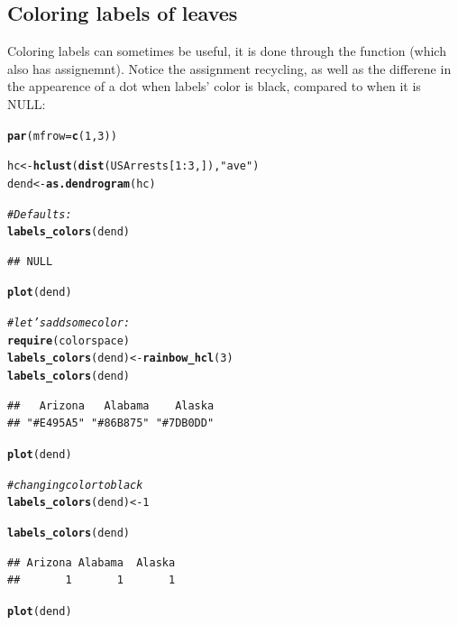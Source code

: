 \documentclass[shortnames,nojss,article]{jss}\usepackage[]{graphicx}\usepackage[]{color}
\makeatletter
\newcommand{\hlnum}[1]{\textcolor[rgb]{0.686,0.059,0.569}{#1}}%
\newcommand{\hlstr}[1]{\textcolor[rgb]{0.192,0.494,0.8}{#1}}%
\newcommand{\hlcom}[1]{\textcolor[rgb]{0.678,0.584,0.686}{\textit{#1}}}%
\newcommand{\hlopt}[1]{\textcolor[rgb]{0,0,0}{#1}}%
\newcommand{\hlstd}[1]{\textcolor[rgb]{0.345,0.345,0.345}{#1}}%
\newcommand{\hlkwb}[1]{\textcolor[rgb]{0.69,0.353,0.396}{#1}}%
\newcommand{\hlkwc}[1]{\textcolor[rgb]{0.333,0.667,0.333}{#1}}%
\newcommand{\hlkwd}[1]{\textcolor[rgb]{0.737,0.353,0.396}{\textbf{#1}}}%
\newenvironment{kframe}{%
 \def\at@end@of@kframe{}%
 \ifinner\ifhmode%
  \def\at@end@of@kframe{\end{minipage}}%
  \begin{minipage}{\columnwidth}%
 \fi\fi%
 \def\FrameCommand##1{\hskip\@totalleftmargin \hskip-\fboxsep
 \colorbox{shadecolor}{##1}\hskip-\fboxsep
     \hskip-\linewidth \hskip-\@totalleftmargin \hskip\columnwidth}%
 \MakeFramed {\advance\hsize-\width
   \@totalleftmargin\z@ \linewidth\hsize
   \@setminipage}}%
 {\par\unskip\endMakeFramed%
 \at@end@of@kframe}
\newenvironment{knitrout}{}{} %
\makeatother
\begin{document}
\subsection{Coloring labels of leaves}

Coloring labels can sometimes be useful, it is done through the  function (which also has assignemnt). Notice the assignment recycling, as well as the differene in the appearence of a dot when labels' color is black, compared to when it is NULL:

\begin{knitrout}
\color{fgcolor}\begin{kframe}
\begin{alltt}
\hlkwd{par}\hlstd{(}\hlkwc{mfrow} \hlstd{=} \hlkwd{c}\hlstd{(}\hlnum{1}\hlstd{,} \hlnum{3}\hlstd{)}\hlstd{)}

\hlstd{hc} \hlkwb{<-} \hlkwd{hclust}\hlstd{(}\hlkwd{dist}\hlstd{(USArrests[}\hlnum{1}\hlopt{:}\hlnum{3}\hlstd{, ]),} \hlstr{"ave"}\hlstd{)}
\hlstd{dend} \hlkwb{<-} \hlkwd{as.dendrogram}\hlstd{(hc}\hlstd{)}

\hlcom{# Defaults:}
\hlkwd{labels_colors}\hlstd{(dend)}
\end{alltt}
\begin{verbatim}
## NULL
\end{verbatim}
\begin{alltt}
\hlkwd{plot}\hlstd{(dend}\hlstd{)}

\hlcom{# let's add some color:}
\hlkwd{require}\hlstd{(colorspace)}
\hlkwd{labels_colors}\hlstd{(dend)} \hlkwb{<-} \hlkwd{rainbow_hcl}\hlstd{(}\hlnum{3}\hlstd{)}
\hlkwd{labels_colors}\hlstd{(dend)}
\end{alltt}
\begin{verbatim}
##   Arizona   Alabama    Alaska 
## "#E495A5" "#86B875" "#7DB0DD"
\end{verbatim}
\begin{alltt}
\hlkwd{plot}\hlstd{(dend}\hlstd{)}

\hlcom{# changing color to black}
\hlkwd{labels_colors}\hlstd{(dend)} \hlkwb{<-} \hlnum{1}
\end{alltt}


{\ttfamily\noindent\color{warningcolor}{\#\# Warning: Length of color vector was shorter than the number of leaves - vector color recycled}}\begin{alltt}
\hlkwd{labels_colors}\hlstd{(dend)}
\end{alltt}
\begin{verbatim}
## Arizona Alabama  Alaska 
##       1       1       1
\end{verbatim}
\begin{alltt}
\hlkwd{plot}\hlstd{(dend)}
\end{alltt}
\end{kframe}


\end{knitrout}
\end{document}
